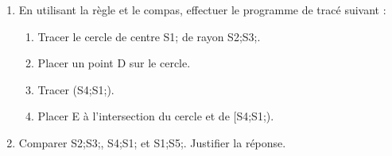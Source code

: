 \documentclass[exercice]{thedocument}%
\begin{document}
%
\begin{enumerate}
    \item En utilisant la règle et le compas, effectuer le programme de tracé suivant :
    \begin{enumerate}
        \item Tracer le cercle de centre \<S1; de rayon \<S2;\<S3;.
        \item Placer un point D sur le cercle.
        \item Tracer (\<S4;\<S1;).
        \item Placer E à l'intersection du cercle et de [\<S4;\<S1;).
    \end{enumerate}
    \item Comparer \<S2;\<S3;, \<S4;\<S1; et \<S1;\<S5;. Justifier la réponse.
\end{enumerate}\vskip15pt
\vskip150pt
\end{document}
